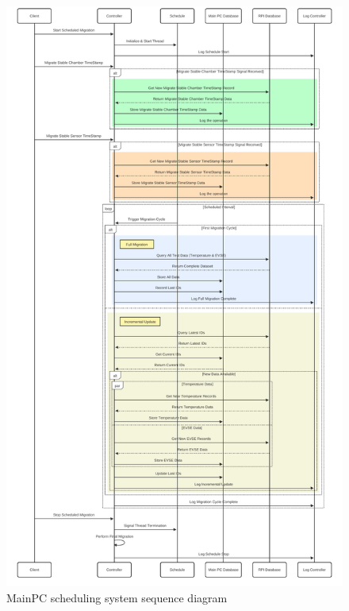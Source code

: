 \begin{figure}[H]
    \centering
    \includegraphics[scale=0.10]{figures/scheduling_1.pdf}
    \caption{MainPC scheduling system sequence diagram}
    \label{fig:scheduling_1}
\end{figure}

